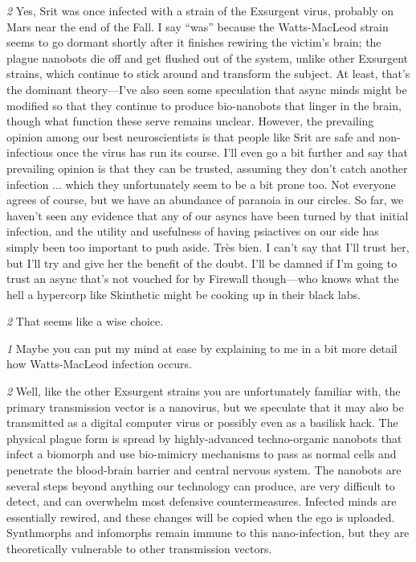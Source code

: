\textit{\textit{2}} Yes, Srit was once infected with a strain of the Exsurgent virus, probably on Mars near the end of the Fall. I say “was” because the Watts-MacLeod strain seems to go dormant shortly after it finishes rewiring the victim’s brain; the plague nanobots die off and get flushed out of the system, unlike other Exsurgent strains, which continue to stick around and transform the subject. At least, that’s the dominant theory—I’ve also seen some speculation that async minds might be modified so that they continue to produce bio-nanobots that linger in the brain, though what function these serve remains unclear. However, the prevailing opinion among our best neuroscientists is that people like Srit are safe and non-infectious once the virus has run its course. I’ll even go a bit further and say that prevailing opinion is that they can be trusted, assuming they don’t catch another infection ... which they unfortunately seem to be a bit prone too. Not everyone agrees of course, but we have an abundance of paranoia in our circles. So far, we haven’t seen any evidence that any of our asyncs have been turned by that initial infection, and the utility and usefulness of having psiactives on our side has simply been too important to push aside. Très bien. I can’t say that I’ll trust her, but I’ll try and give her the benefit of the doubt. I’ll be damned if I’m going to trust an async that’s not vouched for by Firewall though—who knows what the hell a hypercorp like Skinthetic might be cooking up in their black labs. 

\textit{\textit{2}} That seems like a wise choice. 

\textit{\textit{1}} Maybe you can put my mind at ease by explaining to me in a bit more detail how Watts-MacLeod infection occurs. 

\textit{\textit{2}} Well, like the other Exsurgent strains you are unfortunately familiar with, the primary transmission vector is a nanovirus, but we speculate that it may also be transmitted as a digital computer virus or possibly even as a basilisk hack. The physical plague form is spread by highly-advanced techno-organic nanobots that infect a biomorph and use bio-mimicry mechanisms to pass as normal cells and penetrate the blood-brain barrier and central nervous system. The nanobots are several steps beyond anything our technology can produce, are very difficult to detect, and can overwhelm most defensive countermeasures. Infected minds are essentially rewired, and these changes will be copied when the ego is uploaded. Synthmorphs and infomorphs remain immune to this nano-infection, but they are theoretically vulnerable to other transmission vectors. 

